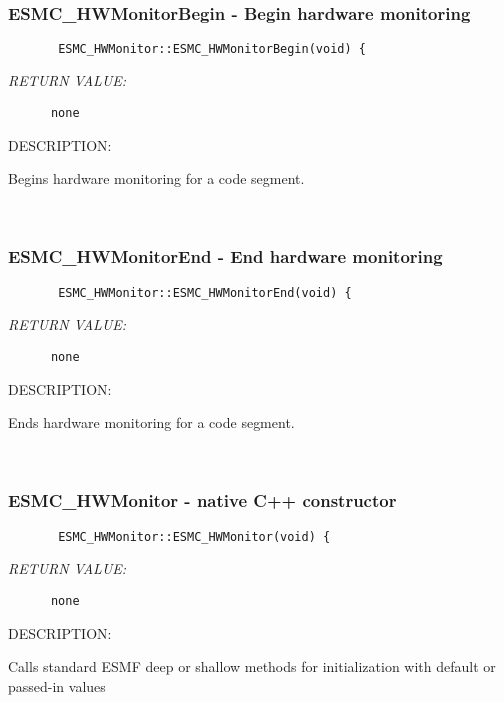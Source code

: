  
\mbox{}\hrulefill\ 
 
\subsubsection{ESMC\_HWMonitorBegin - Begin hardware monitoring}


  
\begin{verbatim}       ESMC_HWMonitor::ESMC_HWMonitorBegin(void) {\end{verbatim}{\em RETURN VALUE:}
\begin{verbatim}      none\end{verbatim}
{\sf DESCRIPTION:\\ }


        Begins hardware monitoring for a code segment.
   
 
\mbox{}\hrulefill\ 
 
\subsubsection{ESMC\_HWMonitorEnd - End hardware monitoring}


  
\begin{verbatim}       ESMC_HWMonitor::ESMC_HWMonitorEnd(void) {\end{verbatim}{\em RETURN VALUE:}
\begin{verbatim}      none\end{verbatim}
{\sf DESCRIPTION:\\ }


        Ends hardware monitoring for a code segment.
   
 
\mbox{}\hrulefill\ 
 
\subsubsection{ESMC\_HWMonitor - native C++ constructor}


  
\begin{verbatim}       ESMC_HWMonitor::ESMC_HWMonitor(void) {\end{verbatim}{\em RETURN VALUE:}
\begin{verbatim}      none\end{verbatim}
{\sf DESCRIPTION:\\ }


        Calls standard ESMF deep or shallow methods for initialization
        with default or passed-in values
  
